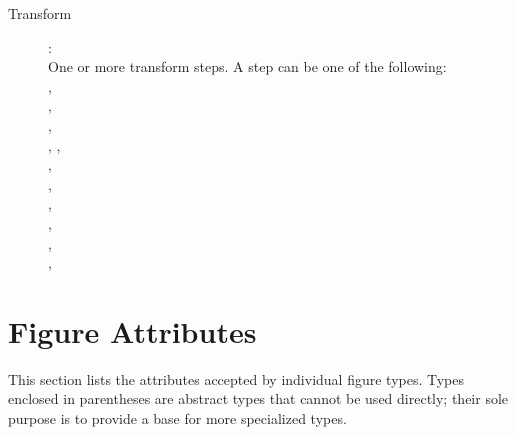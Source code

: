 \begin{description}
\item[Transform]: \\
One or more transform steps. A step can be one of the following: \\
, \\
, \\
, \\
, , \\
, \\
, \\
, \\
, \\
, \\
, \\

\end{description}



\section{Figure Attributes}
\label{sec:figure-definitions:figure-attributes}

This section lists the attributes accepted by individual figure types.
Types enclosed in parentheses are abstract types that cannot be used
directly; their sole purpose is to provide a base for more specialized types.

